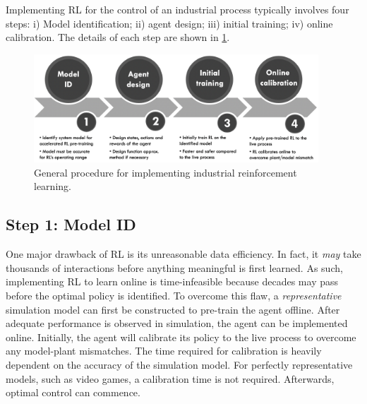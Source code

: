 Implementing RL for the control of an industrial process typically involves four steps: i) Model identification; ii) agent design; iii) initial training; iv) online calibration.  The details of each step are shown in \ref{fig:rl_implementation}.

\begin{figure}[H]
    \centering
    \includegraphics[width=0.95\textwidth]{images/ch4/RL_implementation.jpeg}
    \caption{General procedure for implementing industrial reinforcement learning.}
    \label{fig:rl_implementation}
\end{figure}

\subsection{Step 1: Model ID}
One major drawback of RL is its unreasonable data efficiency.  In fact, it \textit{may} take thousands of interactions before anything meaningful is first learned.  As such, implementing RL to learn online is time-infeasible because decades may pass before the optimal policy is identified.  To overcome this flaw, a \textit{representative} simulation model can first be constructed to pre-train the agent offline.  After adequate performance is observed in simulation, the agent can be implemented online.  Initially, the agent will calibrate its policy to the live process to overcome any model-plant mismatches. The time required for calibration is heavily dependent on the accuracy of the simulation model.  For perfectly representative models, such as video games, a calibration time is not required. Afterwards, optimal control can commence.

